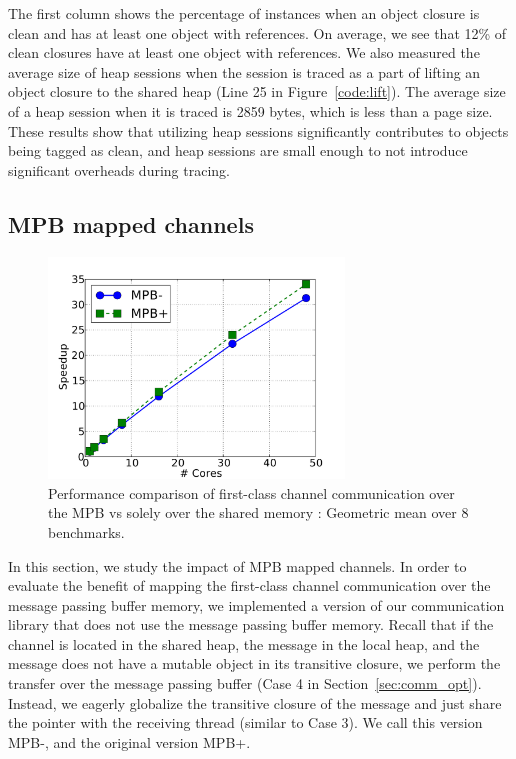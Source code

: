 The first column shows the percentage of instances when an object closure is
clean and has at least one object with  references. On average,
we see that 12\% of clean closures have at least one object with
 references. We also measured the average size of heap sessions
when the session is traced as a part of lifting an object closure to the shared
heap (Line 25 in Figure~\ref{code:lift}). The average size of a heap session
when it is traced is 2859 bytes, which is less than a page size. These results
show that utilizing heap sessions significantly contributes to objects being
tagged as clean, and heap sessions are small enough to not introduce
significant overheads during tracing.


\subsection{MPB mapped channels}

\begin{figure}[t]
\centering
\includegraphics[width=0.7\textwidth]{Graphs/speedup_scc_chan}
\caption{Performance comparison of first-class channel communication over the
MPB  vs solely over the shared memory : Geometric mean
over 8 benchmarks.}
\label{fig:speedup_scc_chan}
\end{figure}


In this section, we study the impact of MPB mapped channels. In order to
evaluate the benefit of mapping the first-class channel communication over the
message passing buffer memory, we implemented a version of our communication
library that does not use the message passing buffer memory. Recall that if the
channel is located in the shared heap, the message in the local heap, and the
message does not have a mutable object in its transitive closure, we perform
the transfer over the message passing buffer (Case 4 in
Section~\ref{sec:comm_opt}). Instead, we eagerly globalize the transitive
closure of the message and just share the pointer with the receiving thread
(similar to Case 3). We call this version MPB-, and the original version MPB+.

